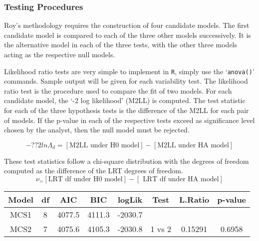 \documentclass[12pt, a4paper]{report}
\theoremstyle{plain}
\theoremstyle{definition}
\theoremstyle{remark}
\begin{document}
\subsubsection{Testing Procedures}
Roy's methodology requires the construction of four candidate models. The first candidate model is compared to each of the three other models successively. It is the
alternative model in each of the three tests, with the other three models acting as the
respective null models.


Likelihood ratio tests are very simple to implement in \texttt{R}, simply use the `\texttt{anova()}'
commands. Sample output will be given for each variability test. The likelihood ratio
test is the procedure used to compare the fit of two models. For each candidate model,
the `-2 log likelihood' (M2LL) is computed. The test statistic for each of the three
hypothesis tests is the difference of the M2LL for each pair of models. If the p-value
in each of the respective tests exceed as significance level chosen by the analyst, then
the null model must be rejected.

\begin{equation}
-??2 ln \Lambda_d = [\mbox{M2LL under H0 model}] - [\mbox{M2LL under HA model}] 
\end{equation}

These test statistics follow a chi-square distribution with the degrees of freedom
computed as the difference of the LRT degrees of freedom.
\begin{equation}	
\nu_ = [ \mbox{LRT df under H0 model}] - [\mbox{ LRT df under HA model}]
\end{equation}	

%	
%	
%		
\begin{center}
	\begin{tabular}{|c|c|c|c|c|c|c|c|}
		\hline
		Model   &      df &   AIC  & BIC      & logLik & Test & L.Ratio & p-value \\ \hline
		MCS1    &       8 & 4077.5 & 4111.3 & -2030.7  &       &         &        \\ \hline
		MCS2    &       7 & 4075.6 & 4105.3 & -2030.8  & 1 vs 2 & 0.15291 & 0.6958 \\
		\hline 
	\end{tabular} 
\end{center}
\end{document}

